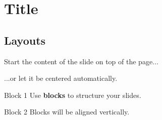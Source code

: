 \documentclass{beamer}
\title{\myTitle}
\author{\myAutors}
\institute{RWTH Aachen University}
\date{\today}
\newcommand{\myTitle}{Title}
\begin{document}
\begin{frame}
    \titlepage
\end{frame}

\section{\myTitle}

\subsection{Layouts}

\begin{frame}[t]
    Start the content of the slide on top of the page...
\end{frame}

\begin{frame}
    ...or let it be centered automatically.
\end{frame}

\begin{frame}
    \begin{block}{Block 1}
        Use \textbf{blocks} to structure your slides.
    \end{block}
    \begin{block}{Block 2}
        Blocks will be aligned vertically.
    \end{block}
\end{frame}
\end{document}
